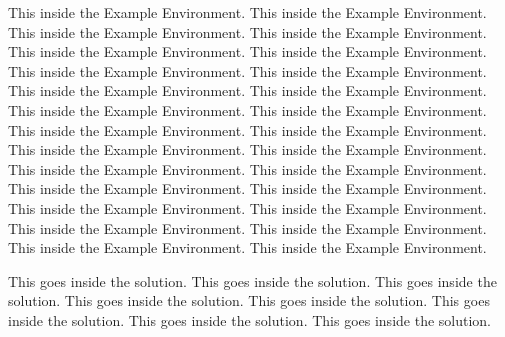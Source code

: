 \begin{example}
This inside the Example Environment. This inside the Example Environment. 
This inside the Example Environment. This inside the Example Environment. 
This inside the Example Environment. This inside the Example Environment. 
This inside the Example Environment. This inside the Example Environment. 
This inside the Example Environment. This inside the Example Environment. 
This inside the Example Environment. This inside the Example Environment. 
This inside the Example Environment. This inside the Example Environment. 
This inside the Example Environment. This inside the Example Environment. 
This inside the Example Environment. This inside the Example Environment. 
This inside the Example Environment. This inside the Example Environment. 
This inside the Example Environment. This inside the Example Environment. 
This inside the Example Environment. This inside the Example Environment. 
This inside the Example Environment. This inside the Example Environment.
\end{example}

\begin{solution}
This goes inside the solution. This goes inside the solution. This goes inside the solution. 
This goes inside the solution. This goes inside the solution. 
This goes inside the solution. This goes inside the solution. This goes inside the solution. 
\end{solution}

